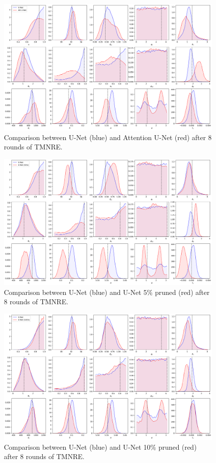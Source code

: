 \begin{appendices}
\begin{figure}[htb]
  \centering
  \includegraphics[width=0.85\linewidth]{media/images/Posteriors_AttentionUNet_2_round_8.png}
  \caption{Comparison between U-Net (blue) and Attention U-Net (red) after 8 rounds of TMNRE.}
  \label{fig:posterior_attention_unet}
\end{figure}

\begin{figure}[htb]
  \centering
  \includegraphics[width=0.85\linewidth]{media/images/Posteriors_UNet_pruned5_2_round_8.png}
  \caption{Comparison between U-Net (blue) and U-Net 5\% pruned (red) after 8 rounds of TMNRE.}
  \label{fig:posterior_unet_pruned_5pc}
\end{figure}

\begin{figure}[htb]
  \centering
  \includegraphics[width=0.85\linewidth]{media/images/Posteriors_UNet_pruned10_round_8.png}
  \caption{Comparison between U-Net (blue) and U-Net 10\% pruned (red) after 8 rounds of TMNRE.}
  \label{fig:posterior_unet_pruned_10pc}
\end{figure}


\end{appendices}
